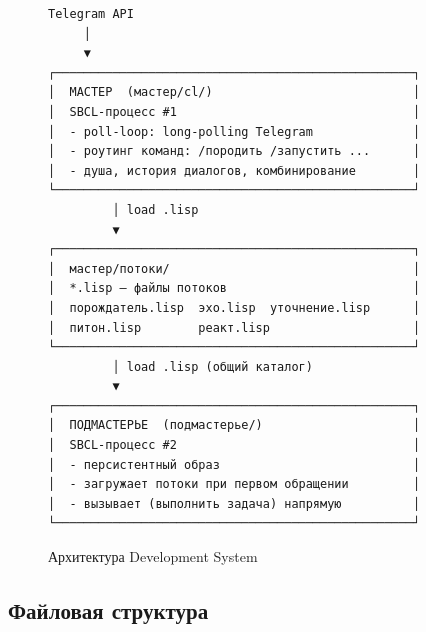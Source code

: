 \documentclass[11pt,a4paper]{article}
\begin{document}
\begin{figure}[H]
\centering
\small
\begin{verbatim}
Telegram API
     │
     ▼
┌──────────────────────────────────────────────────┐
│  МАСТЕР  (мастер/cl/)                            │
│  SBCL-процесс #1                                 │
│  - poll-loop: long-polling Telegram              │
│  - роутинг команд: /породить /запустить ...      │
│  - душа, история диалогов, комбинирование        │
└──────────────────────────────────────────────────┘
         │ load .lisp
         ▼
┌──────────────────────────────────────────────────┐
│  мастер/потоки/                                  │
│  *.lisp — файлы потоков                          │
│  порождатель.lisp  эхо.lisp  уточнение.lisp      │
│  питон.lisp        реакт.lisp                    │
└──────────────────────────────────────────────────┘
         │ load .lisp (общий каталог)
         ▼
┌──────────────────────────────────────────────────┐
│  ПОДМАСТЕРЬЕ  (подмастерье/)                     │
│  SBCL-процесс #2                                 │
│  - персистентный образ                           │
│  - загружает потоки при первом обращении         │
│  - вызывает (выполнить задача) напрямую          │
└──────────────────────────────────────────────────┘
\end{verbatim}
\caption{Архитектура Development System}
\label{fig:arch}
\end{figure}

\subsection{Файловая структура}
\end{document}
